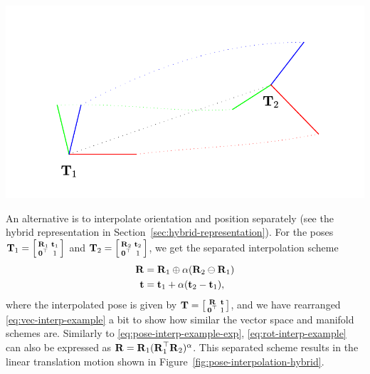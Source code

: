 \begin{example}[frametitle=Interpolation on the manifold]
{
  \centering
  \includegraphics[width=0.75\columnwidth]{figures/pose_interpolation_hybrid.pdf}
  \captionsetup{type=figure}
  \label{fig:pose-interpolation-hybrid}
  \par
}
An alternative is to interpolate orientation and position separately (see the hybrid representation in Section~\ref{sec:hybrid-representation}).
For the poses ${\boldsymbol{\mathbf{T}}}_1 = \begin{bsmallmatrix} {\boldsymbol{\mathbf{R}}}_1 & {\boldsymbol{\mathbf{t}}}_1\\ \boldsymbol{\mathbf{0}}^{\top} & 1 \end{bsmallmatrix}$ and ${\boldsymbol{\mathbf{T}}}_2 = \begin{bsmallmatrix} {\boldsymbol{\mathbf{R}}}_2 & {\boldsymbol{\mathbf{t}}}_2\\ \boldsymbol{\mathbf{0}}^{\top} & 1 \end{bsmallmatrix}$, we get the separated interpolation scheme
\begin{align}
  {\boldsymbol{\mathbf{R}}} &= {\boldsymbol{\mathbf{R}}}_1 \oplus \alpha({\boldsymbol{\mathbf{R}}}_2 \ominus {\boldsymbol{\mathbf{R}}}_1)\label{eq:rot-interp-example}\\ 
  {\boldsymbol{\mathbf{t}}} &= {\boldsymbol{\mathbf{t}}}_1 + \alpha({\boldsymbol{\mathbf{t}}}_2 - {\boldsymbol{\mathbf{t}}}_1),
\end{align}
where the interpolated pose is given by ${\boldsymbol{\mathbf{T}}} = \begin{bsmallmatrix} {\boldsymbol{\mathbf{R}}} & {\boldsymbol{\mathbf{t}}}\\ \boldsymbol{\mathbf{0}}^{\top} & 1 \end{bsmallmatrix}$, and we have rearranged \eqref{eq:vec-interp-example} a bit to show how similar the vector space and manifold schemes are.
Similarly to \eqref{eq:pose-interp-example-exp}, \eqref{eq:rot-interp-example} can also be expressed as ${\boldsymbol{\mathbf{R}}} = {\boldsymbol{\mathbf{R}}}_1({\boldsymbol{\mathbf{R}}}_1^{\top} {\boldsymbol{\mathbf{R}}}_2)^\alpha$.
This separated scheme results in the linear translation motion shown in Figure~\ref{fig:pose-interpolation-hybrid}.
\end{example}

